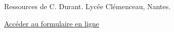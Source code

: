 
Ressources de C. Durant. Lycée Clémenceau, Nantes.
\begin{center}
\end{center}

\href{https://forms.gle/iATEMMKfh26mNXRi7}{Accéder au formulaire en ligne}


